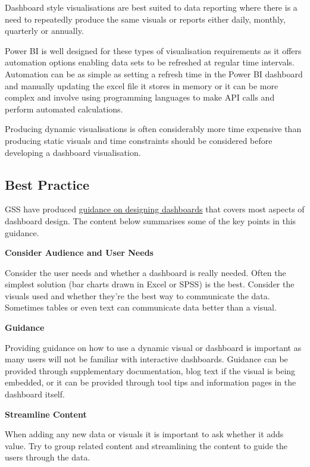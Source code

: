 \documentclass[
]{book}
\begin{document}
Dashboard style visualisations are best suited to data reporting where there is a need to repeatedly produce the same visuals or reports either daily, monthly, quarterly or annually.

Power BI is well designed for these types of visualisation requirements as it offers automation options enabling data sets to be refreshed at regular time intervals.
Automation can be as simple as setting a refresh time in the Power BI dashboard and manually updating the excel file it stores in memory or it can be more complex and involve using programming languages to make API calls and perform automated calculations.

Producing dynamic visualisations is often considerably more time expensive than producing static visuals and time constraints should be considered before developing a dashboard visualisation.

\hypertarget{best-practice}{%
\subsection{Best Practice}\label{best-practice}}

GSS have produced \href{https://gss.civilservice.gov.uk/policy-store/top-tips-for-designing-dashboards/}{guidance on designing dashboards} that covers most aspects of dashboard design. The content below summarises some of the key points in this guidance.

\textbf{Consider Audience and User Needs}

Consider the user needs and whether a dashboard is really needed. Often the simplest solution (bar charts drawn in Excel or SPSS) is the best. Consider the visuals used and whether they're the best way to communicate the data. Sometimes tables or even text can communicate data better than a visual.

\textbf{Guidance}

Providing guidance on how to use a dynamic visual or dashboard is important as many users will not be familiar with interactive dashboards. Guidance can be provided through supplementary documentation, blog text if the visual is being embedded, or it can be provided through tool tips and information pages in the dashboard itself.

\textbf{Streamline Content}

When adding any new data or visuals it is important to ask whether it adds value. Try to group related content and streamlining the content to guide the users through the data.
\end{document}
